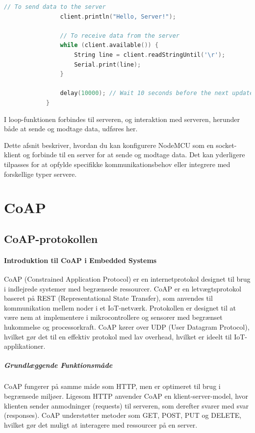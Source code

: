 \documentclass[12pt,a4paper]{book}
\begin{document}
\begin{enumerate}
\begin{lstlisting}[language=C++, caption=Syntaks]
				// To send data to the server
				client.println("Hello, Server!");
				
				// To receive data from the server
				while (client.available()) {
					String line = client.readStringUntil('\r');
					Serial.print(line);
				}
				
				delay(10000); // Wait 10 seconds before the next update
			}
		\end{lstlisting}
		I loop-funktionen forbindes til serveren, og interaktion med serveren, herunder både at sende og modtage data, udføres her.
	\end{enumerate}
	Dette afsnit beskriver, hvordan du kan konfigurere NodeMCU som en socket-klient og forbinde til en server for at sende og modtage data. Det kan yderligere tilpasses for at opfylde specifikke kommunikationsbehov eller integrere med forskellige typer servere.
	
	\chapter{CoAP}
	\section{CoAP-protokollen}
	\subsubsection{Introduktion til CoAP i Embedded Systems}
	CoAP (Constrained Application Protocol) er en internetprotokol designet til brug i indlejrede systemer med begrænsede ressourcer. CoAP er en letvægtsprotokol baseret på REST (Representational State Transfer), som anvendes til kommunikation mellem noder i et IoT-netværk. Protokollen er designet til at være nem at implementere i mikrocontrollere og sensorer med begrænset hukommelse og processorkraft. CoAP kører over UDP (User Datagram Protocol), hvilket gør det til en effektiv protokol med lav overhead, hvilket er ideelt til IoT-applikationer.
	
	\paragraph{Grundlæggende Funktionsmåde}
	CoAP fungerer på samme måde som HTTP, men er optimeret til brug i begrænsede miljøer. Ligesom HTTP anvender CoAP en klient-server-model, hvor klienten sender anmodninger (requests) til serveren, som derefter svarer med svar (responses). CoAP understøtter metoder som GET, POST, PUT og DELETE, hvilket gør det muligt at interagere med ressourcer på en server.
	
\end{document}

